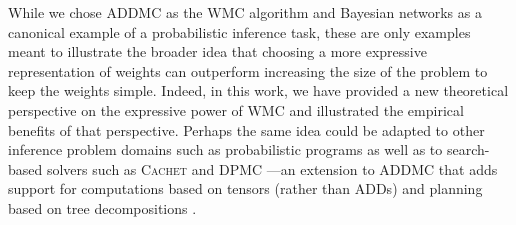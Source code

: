 While we chose \textsc{ADDMC} \citep{DBLP:conf/aaai/DudekPV20} as the WMC
algorithm and Bayesian networks as a canonical example of a probabilistic
inference task, these are only examples meant to illustrate the broader idea
that choosing a more expressive representation of weights can outperform
increasing the size of the problem to keep the weights simple. Indeed, in this
work, we have provided a new theoretical perspective on the expressive power of
WMC and illustrated the empirical benefits of that perspective. Perhaps the same
idea could be adapted to other inference problem domains such as probabilistic
programs
\citep{DBLP:journals/tplp/FierensBRSGTJR15,DBLP:journals/corr/abs-2005-09089} as
well as to search-based solvers such as \textsc{Cachet}
\citep{DBLP:conf/sat/SangBBKP04} and \textsc{DPMC} ---an extension to
\textsc{ADDMC} that adds support for computations based on tensors (rather than
ADDs) and planning based on tree decompositions \citep{DBLP:conf/cp/DudekPV20}.
